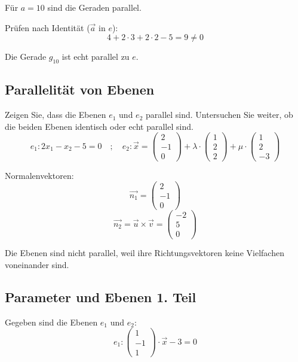 \documentclass{ajc}
\numberwithin{equation}{subsection}
\begin{document}
	Für $a = 10$ sind die Geraden parallel.
	
	Prüfen nach Identität ($\vec{a}$ in $e$):
	\begin{equation}
		4 + 2 \cdot 3 + 2 \cdot 2 - 5 = 9 \neq 0
	\end{equation}
	
	Die Gerade $g_10$ ist echt parallel zu $e$.
	
	\subsection{Parallelität von Ebenen}
	Zeigen Sie, dass die Ebenen $e_1$ und $e_2$ parallel sind. Untersuchen Sie weiter, ob die beiden Ebenen identisch oder echt parallel sind.
	\begin{equation}
		e_1: 2x_1 - x_2 - 5 = 0 \quad ; \quad e_2: \vec{x} = \left(\begin{array}{r} 2 \\ -1 \\ 0\end{array}\right) + \lambda \cdot \left(\begin{array}{r} 1 \\ 2 \\ 2\end{array}\right) + \mu \cdot \left(\begin{array}{r} 1 \\ 2 \\ -3\end{array}\right)
	\end{equation}
	
	Normalenvektoren:
	\begin{equation}
		\vec{n_1} = \left(\begin{array}{r} 2 \\ -1 \\ 0\end{array}\right)
	\end{equation}
	\begin{equation}
		\vec{n_2} = \vec{u} \times \vec{v} = \left(\begin{array}{r} -2 \\ 5 \\ 0\end{array}\right)
	\end{equation}
	
	Die Ebenen sind nicht parallel, weil ihre Richtungsvektoren keine Vielfachen voneinander sind.
	
	\subsection{Parameter und Ebenen 1. Teil}
	Gegeben sind die Ebenen $e_1$ und $e_2$:
	\begin{equation}
		e_1: \left(\begin{array}{r} 1 \\ -1 \\ 1\end{array}\right) \cdot \vec{x} - 3 = 0 
	\end{equation}
	
\end{document}
